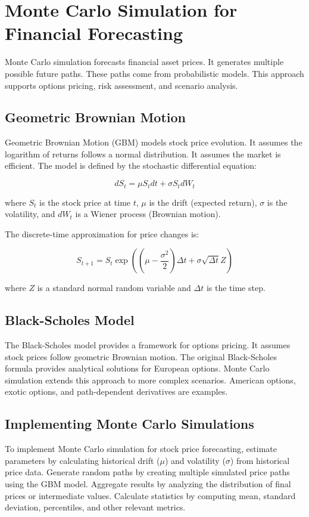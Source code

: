 \section{Monte Carlo Simulation for Financial Forecasting}

Monte Carlo simulation forecasts financial asset prices. It generates multiple possible future paths. These paths come from probabilistic models. This approach supports options pricing, risk assessment, and scenario analysis.

\subsection{Geometric Brownian Motion}

Geometric Brownian Motion (GBM) models stock price evolution. It assumes the logarithm of returns follows a normal distribution. It assumes the market is efficient. The model is defined by the stochastic differential equation:

\[
dS_t = \mu S_t dt + \sigma S_t dW_t
\]

where \(S_t\) is the stock price at time \(t\), \(\mu\) is the drift (expected return), \(\sigma\) is the volatility, and \(dW_t\) is a Wiener process (Brownian motion).

The discrete-time approximation for price changes is:

\[
S_{t+1} = S_t \exp\left((\mu - \frac{\sigma^2}{2})\Delta t + \sigma \sqrt{\Delta t} Z\right)
\]

where \(Z\) is a standard normal random variable and \(\Delta t\) is the time step.

\subsection{Black-Scholes Model}

The Black-Scholes model provides a framework for options pricing. It assumes stock prices follow geometric Brownian motion. The original Black-Scholes formula provides analytical solutions for European options. Monte Carlo simulation extends this approach to more complex scenarios. American options, exotic options, and path-dependent derivatives are examples.

\subsection{Implementing Monte Carlo Simulations}

To implement Monte Carlo simulation for stock price forecasting, estimate parameters by calculating historical drift (\(\mu\)) and volatility (\(\sigma\)) from historical price data. Generate random paths by creating multiple simulated price paths using the GBM model. Aggregate results by analyzing the distribution of final prices or intermediate values. Calculate statistics by computing mean, standard deviation, percentiles, and other relevant metrics.

